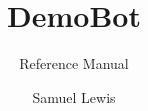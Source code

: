 \documentclass{technical-reference-manual}
\title{DemoBot}
\subtitle{Reference Manual}
\author{Samuel Lewis}
\begin{document}
	
	\graphicspath{ {./assets/} }
	
	\maketitle
	
\end{document}
